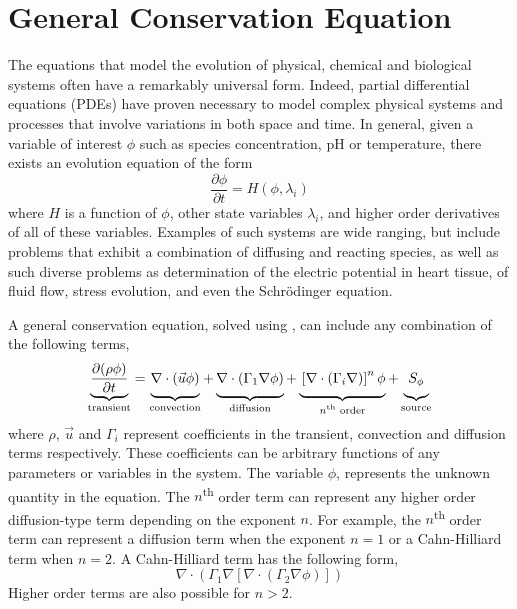 \section{General Conservation Equation}
\label{sec:GeneralConservationEquation}

The equations that model the evolution of physical, chemical and
biological systems often have a remarkably universal form.  Indeed,
partial differential equations (PDEs) have proven necessary to model
complex physical systems and processes that involve variations in both
space and time.  In general, given a variable of interest \( \phi \)
such as species concentration, pH or temperature, there exists an
evolution equation of the form
\begin{equation}
  \frac{\partial \phi}{\partial t} = H(\phi, \lambda_i)
  \label{eqn:general-equation}
\end{equation}
where \( H \) is a function of \(\phi\), other state variables
\(\lambda_i\), and higher order derivatives of all of these variables.
Examples of such systems are wide ranging, but include problems that
exhibit a combination of diffusing and reacting species, as well as
such diverse problems as determination of the electric potential in
heart tissue, of fluid flow, stress evolution, and even the
Schr\"odinger equation.

A general conservation equation, solved using \FiPy{}, can include any
combination of the following terms,
\begin{equation}                        
  \underbrace{
  \frac{\partial (\rho \phi)}{\partial t}
  }_{\text{transient}}
=
\underbrace{
  \vphantom{\frac{\partial (\rho \phi)}{\partial t}}
  \nabla \cdot \left( \vec{u} \phi \right)
}_{\text{convection}}
+
\underbrace{
  \vphantom{\frac{\partial (\rho \phi)}{\partial t}}
  \nabla \cdot \left( \Gamma_1 \nabla \phi \right) 
}_{\text{diffusion}}
+
\underbrace{
  \vphantom{\frac{\partial (\rho \phi)}{\partial t}}
  \left[ \nabla \cdot \left( \Gamma_i \nabla \right) \right]^n \phi
}_{\text{$n$\textsuperscript{th} order}}
+
\underbrace{
  \vphantom{\frac{\partial (\rho \phi)}{\partial t}}
  S_{\phi}
}_{\text{source}}
\label{eqn:num:gen}
\end{equation}
where $\rho$, $\vec{u}$ and $\Gamma_i$ represent coefficients in the
transient, convection and diffusion terms respectively.  These
coefficients can be arbitrary functions of any parameters or variables
in the system.  The variable $\phi$, represents the unknown quantity
in the equation.  The $n$\textsuperscript{th} order term can represent
any higher order diffusion-type term depending on the exponent $n$.
For example, the $n$\textsuperscript{th} order term can represent a
diffusion term when the exponent $n = 1$ or a Cahn-Hilliard term when
$n = 2$.  A Cahn-Hilliard term has the following form,
\begin{equation}
  \nabla \cdot \left( \Gamma_1 \nabla \left[ 
  \nabla \cdot \left( \Gamma_2 \nabla \phi \right) \right] \right)
  \label{eqn:cahn-hilliard}
\end{equation}
Higher order terms are also possible for $n > 2$.



